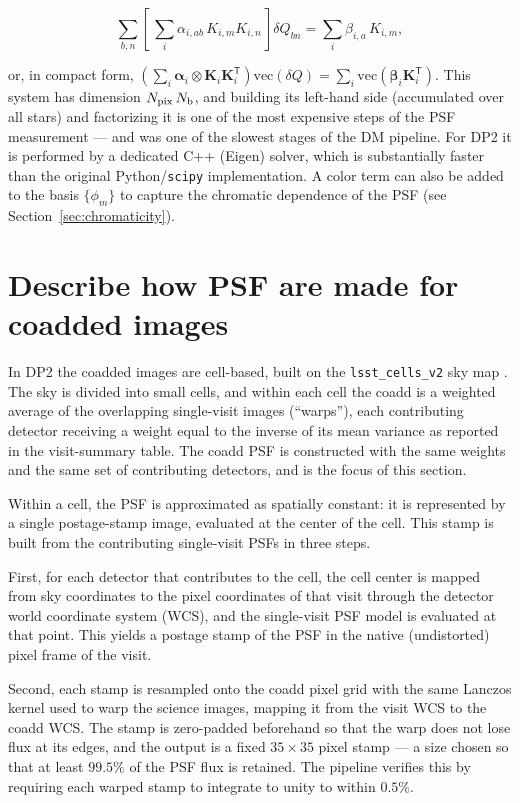 \begin{equation}
    \sum_{b,n}\left[\, \sum_i \alpha_{i,ab}\, K_{i,m} K_{i,n} \,\right]
        \delta Q_{bn}
    = \sum_i \beta_{i,a}\, K_{i,m},
    \label{eq:interp_normal}
\end{equation}

or, in compact form,
$\left(\sum_i \boldsymbol{\alpha}_i \otimes \mathbf{K}_i\mathbf{K}_i^{\mathsf T}\right)
\mathrm{vec}(\delta Q) = \sum_i \mathrm{vec}\!\left(\boldsymbol{\beta}_i
\mathbf{K}_i^{\mathsf T}\right)$. This system has dimension
$N_{\rm pix}\,N_{\rm b}$, and building its left-hand side (accumulated over all
stars) and factorizing it is one of the most expensive steps of the PSF
measurement --- and was one of the slowest stages of the DM pipeline. For DP2 it
is performed by a dedicated C++ (Eigen) solver, which is substantially faster
than the original Python/\texttt{scipy} implementation. A color term can also be
added to the basis $\{\phi_m\}$ to capture the chromatic dependence of the PSF
(see Section~\ref{sec:chromaticity}).

\section{Describe how PSF are made for coadded images}

In DP2 the coadded images are cell-based, built on the \texttt{lsst\_cells\_v2}
sky map \REF. The sky is divided into small cells, and within each cell the
coadd is a weighted average of the overlapping single-visit images (``warps''),
each contributing detector receiving a weight equal to the inverse of its mean
variance as reported in the visit-summary table. The coadd PSF is constructed
with the same weights and the same set of contributing detectors, and is the
focus of this section.

Within a cell, the PSF is approximated as spatially constant: it is represented
by a single postage-stamp image, evaluated at the center of the cell. This stamp
is built from the contributing single-visit PSFs in three steps.

First, for each detector that contributes to the cell, the cell center is mapped
from sky coordinates to the pixel coordinates of that visit through the detector
world coordinate system (WCS), and the single-visit PSF model is evaluated at
that point. This yields a postage stamp of the PSF in the native (undistorted)
pixel frame of the visit.

Second, each stamp is resampled onto the coadd pixel grid with the same Lanczos
kernel used to warp the science images, mapping it from the visit WCS to the
coadd WCS. The stamp is zero-padded beforehand so that the warp does not lose
flux at its edges, and the output is a fixed $35\times35$ pixel stamp --- a size
chosen so that at least $99.5\%$ of the PSF flux is retained. The pipeline
verifies this by requiring each warped stamp to integrate to unity to within
$0.5\%$.

